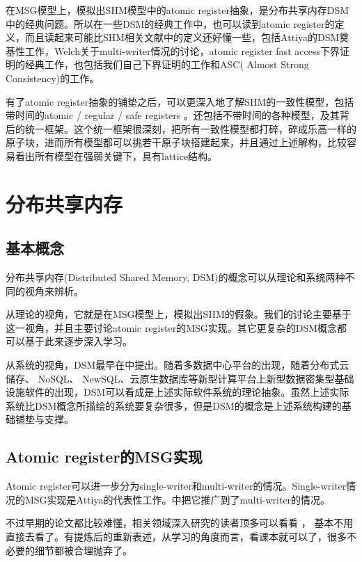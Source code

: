 \documentclass[UTF8]{ctexrep}
\begin{document}
在MSG模型上，模拟出SHM模型中的atomic register抽象，是分布共享内存DSM中的经典问题。所以在一些DSM的经典工作中，也可以读到atomic register的定义，而且读起来可能比SHM相关文献中的定义还好懂一些，包括Attiya的DSM奠基性工作\cite{Attiya95}，Welch关于multi-writer情况的讨论\cite{Shao11}，atomic register fast access下界证明的经典工作\cite{Dutta10}，也包括我们自己下界证明的工作\cite{Huang20}和ASC( Almost Strong Consistency)的工作\cite{Wei17, Ouyang21}。

有了atomic register抽象的铺垫之后，可以更深入地了解SHM的一致性模型，包括带时间的atomic / regular / safe registers \cite{Lamport86a, Lamport86b, Shao11}。还包括不带时间的各种模型，及其背后的统一框架\cite{Steinke04}。这个统一框架很深刻，把所有一致性模型都打碎，碎成乐高一样的原子块，进而所有模型都可以挑若干原子块搭建起来，并且通过上述解构，比较容易看出所有模型在强弱关键下，具有lattice结构。


\chapter{分布共享内存}

\section{基本概念}

分布共享内存(Distributed Shared Memory, DSM)的概念可以从理论和系统两种不同的视角来辨析。

从理论的视角，它就是在MSG模型上，模拟出SHM的假象。我们的讨论主要基于这一视角，并且主要讨论atomic register的MSG实现。其它更复杂的DSM概念都可以基于此来逐步深入学习。

从系统的视角，DSM最早在\cite{Li89}中提出。随着多数据中心平台的出现，随着分布式云储存、 NoSQL、 NewSQL、云原生数据库等新型计算平台上新型数据密集型基础设施软件的出现，DSM可以看成是上述实际软件系统的理论抽象。虽然上述实际系统比DSM概念所描绘的系统要复杂很多，但是DSM的概念是上述系统构建的基础铺垫与支撑。

\section{Atomic register的MSG实现}

Atomic register可以进一步分为single-writer和multi-writer的情况。Single-writer情况的MSG实现是Attiya的代表性工作\cite{Attiya95}。\cite{Lynch97}中把它推广到了multi-writer的情况。

不过早期的论文都比较难懂，相关领域深入研究的读者顶多可以看看 \cite{Attiya95}，\cite{Lynch97} 基本不用直接去看了。\cite[Chap 16]{Aspnes19}有提炼后的重新表述，从学习的角度而言，看课本就可以了，很多不必要的细节都被合理抛弃了。
\end{document}
